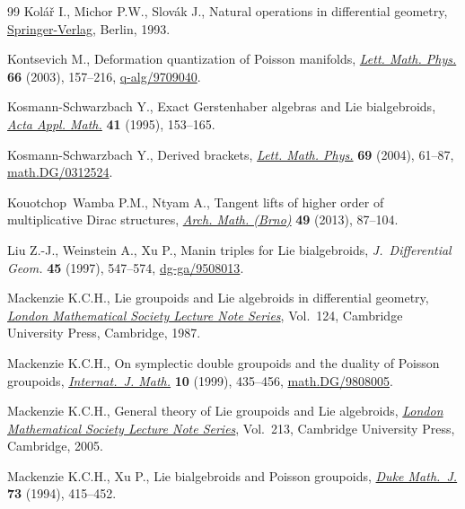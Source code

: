 \documentclass[pdftex]{sigma}
\numberwithin{equation}{section}
\begin{document}
\begin{thebibliography}{99}
Kol{\'a}{\v{r}} I., Michor P.W., Slov{\'a}k J., Natural operations in
  dif\/ferential geometry, \href{http://dx.doi.org/10.1007/978-3-662-02950-3}{Springer-Verlag}, Berlin, 1993.

Kontsevich M., Deformation quantization of {P}oisson manifolds, \href{http://dx.doi.org/10.1023/B:MATH.0000027508.00421.bf}{\textit{Lett.
  Math. Phys.}} \textbf{66} (2003), 157--216, \mbox{\href{http://arxiv.org/abs/q-alg/9709040}{q-alg/9709040}}.

Kosmann-Schwarzbach Y., Exact {G}erstenhaber algebras and {L}ie bialgebroids,
  \href{http://dx.doi.org/10.1007/BF00996111}{\textit{Acta Appl. Math.}} \textbf{41} (1995), 153--165.

Kosmann-Schwarzbach Y., Derived brackets, \href{http://dx.doi.org/10.1007/s11005-004-0608-8}{\textit{Lett. Math. Phys.}}
  \textbf{69} (2004), 61--87, \href{http://arxiv.org/abs/math.DG/0312524}{math.DG/0312524}.

Kouotchop~Wamba P.M., Ntyam A., Tangent lifts of higher order of multiplicative
  {D}irac structures, \href{http://dx.doi.org/10.5817/AM2013-2-87}{\textit{Arch. Math. (Brno)}} \textbf{49} (2013), 87--104.

Liu Z.-J., Weinstein A., Xu P., Manin triples for {L}ie bialgebroids,
  \textit{J.~Differential Geom.} \textbf{45} (1997), 547--574,
  \href{http://arxiv.org/abs/dg-ga/9508013}{dg-ga/9508013}.

Mackenzie K.C.H., Lie groupoids and {L}ie algebroids in dif\/ferential geometry,
  \href{http://dx.doi.org/10.1017/CBO9780511661839}{\textit{London Mathematical Society Lecture Note Series}}, Vol.~124, Cambridge
  University Press, Cambridge, 1987.

Mackenzie K.C.H., On symplectic double groupoids and the duality of {P}oisson
  groupoids, \href{http://dx.doi.org/10.1142/S0129167X99000185}{\textit{Internat.~J. Math.}} \textbf{10} (1999), 435--456,
  \href{http://arxiv.org/abs/math.DG/9808005}{math.DG/9808005}.

Mackenzie K.C.H., General theory of {L}ie groupoids and {L}ie algebroids,
  \href{http://dx.doi.org/10.1017/CBO9781107325883}{\textit{London Mathematical Society Lecture Note Series}}, Vol.~213, Cambridge
  University Press, Cambridge, 2005.

Mackenzie K.C.H., Xu P., Lie bialgebroids and {P}oisson groupoids, \href{http://dx.doi.org/10.1215/S0012-7094-94-07318-3}{\textit{Duke
  Math.~J.}} \textbf{73} (1994), 415--452.


\end{thebibliography}
\end{document}
